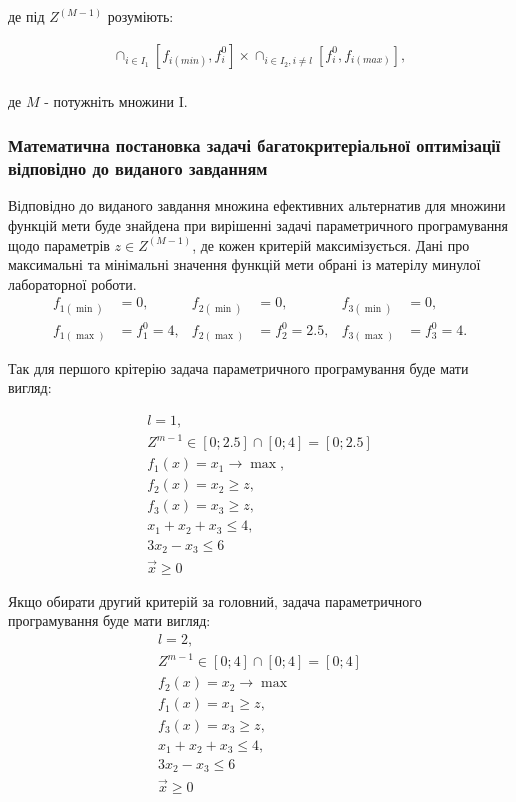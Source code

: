 де під $Z^(M-1)$ розуміють:

\begin{gather*}
    \cap_{i \in I_1} ^ {} [f_{i(min)}, f_i^0] \times \cap_{i \in I_2, i \not = l} ^ {} [f_i^0, f_{i(max)}], \\
\end{gather*}

де $M$ - потужніть множини I.

\subsubsection{Математична постановка задачі багатокритеріальної оптимізації відповідно до виданого завданням}

Відповідно до виданого завдання множина ефективних альтернатив для множини функцій мети буде знайдена при вирішенні задачі параметричного програмування щодо параметрів $z \in Z^(M-1)$, де кожен критерій максимізується.
Дані про максимальні та мінімальні значення функцій мети обрані із матерілу минулої лабораторної роботи.
\begin{align*}
    f_{1(\min)}&=0, &   f_{2(\min)}&=0, &   f_{3(\min)}&=0, \\
    f_{1(\max)}&=f_1^0=4,   &   f_{2(\max)}&=f_2^0=2.5, &   f_{3(\max)}&=f_3^0=4.
\end{align*} 

Так для першого крітерію задача параметричного програмування буде мати вигляд:

\begin{gather*} 
    l = 1, \\
    Z^{m-1} \in [0; 2.5] \cap [0; 4] = [0; 2.5] \\
    f_1 (x) = x_1 \to \max, \\
    f_2 (x) = x_2 \geqslant z,  \\
    f_3 (x) = x_3 \geqslant z,  \\
    x_1 + x_2 + x_3 \leqslant 4, \\
    3 x_2 - x_3 \leqslant 6 \\
    \vec{x} \geqslant 0
\end{gather*}

Якщо обирати другий критерій за головний, задача параметричного програмування буде мати вигляд:
\begin{gather*} 
    l = 2, \\
    Z^{m-1} \in [0; 4] \cap [0; 4] = [0; 4] \\
    f_2 (x) = x_2 \to \max \\
    f_1 (x) = x_1 \geqslant z,  \\
    f_3 (x) = x_3 \geqslant z,  \\
    x_1 + x_2 + x_3 \leqslant 4, \\
    3 x_2 - x_3 \leqslant 6 \\
    \vec{x} \geqslant 0
\end{gather*}

